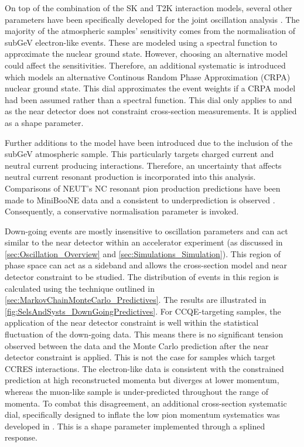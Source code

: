 
On top of the combination of the SK and T2K interaction models, several other parameters have been specifically developed for the joint oscillation analysis \cite{t2k_tn_422}. The majority of the atmospheric samples'  sensitivity comes from the normalisation of subGeV electron-like events. These are modeled using a spectral function to approximate the nuclear ground state. However, choosing an alternative model could affect the sensitivities. Therefore, an additional systematic is introduced which models an alternative Continous Random Phase Approximation (CRPA) nuclear ground state. This dial approximates the event weights if a CRPA model had been assumed rather than a spectral function. This dial only applies to  and  as the near detector does not constraint  cross-section measurements. It is applied as a shape parameter.

Further additions to the model have been introduced due to the inclusion of the subGeV  atmospheric sample. This particularly targets charged current and neutral current  producing interactions. Therefore, an uncertainty that affects neutral current resonant  production is incorporated into this analysis. Comparisons of NEUT's NC resonant pion production predictions have been made to MiniBooNE \cite{MB_NC1pi0} data and a consistent  to  underprediction is observed \cite{t2k_tn_422}. Consequently, a conservative  normalisation parameter is invoked. 

Down-going events are mostly insensitive to oscillation parameters and can act similar to the near detector within an accelerator experiment (as discussed in \autoref{sec:Oscillation_Overview} and \autoref{sec:Simulations_Simulation}). This region of phase space can act as a sideband and allows the cross-section model and near detector constraint to be studied. The distribution of events in this region is calculated using the technique outlined in \autoref{sec:MarkovChainMonteCarlo_Predictives}. The results are illustrated in \autoref{fig:SelsAndSysts_DownGoingPredictives}. For CCQE-targeting samples, the application of the near detector constraint is well within the statistical fluctuation of the down-going data. This means there is no significant tension observed between the data and the Monte Carlo prediction after the near detector constraint is applied. This is not the case for samples which target CCRES interactions. The electron-like data is consistent with the constrained prediction at high reconstructed momenta but diverges at lower momentum, whereas the muon-like sample is under-predicted throughout the range of momenta. To combat this disagreement, an additional cross-section systematic dial, specifically designed to inflate the low pion momentum systematics was developed in \cite{t2k_tn_422}. This is a shape parameter implemented through a splined response. 

